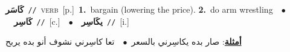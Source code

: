 \documentclass[10pt,a4paper,twoside]{article} %
\begin{document}
\begin{multicols}{2}
{\setlength\topsep{0pt}\textbf{\foreignlanguage{arabic}{كَاسَر}}\ {\color{gray}\texttt{//}\color{black}}\ \textsc{verb}\ [p.]\ \textbf{1.}~bargain (lowering the price).  \textbf{2.}~do arm wrestling\ \ $\bullet$\ \ \setlength\topsep{0pt}\textbf{\foreignlanguage{arabic}{كَاسِر}}\ {\color{gray}\texttt{//}\color{black}}\ [c.]\ \ $\bullet$\ \ \setlength\topsep{0pt}\textbf{\foreignlanguage{arabic}{يكَاسِر}}\ {\color{gray}\texttt{//}\color{black}}\ [i.]\  \begin{flushright}\color{gray}\foreignlanguage{arabic}{\textbf{\underline{\foreignlanguage{arabic}{أمثلة}}}: صار بده يكاسِرني بالسعر\ $\bullet$\ \  تعا كاسِرني نشوف أنو بده يربح}\end{flushright}\color{black}} \vspace{2mm}


\end{multicols}
\end{document}
